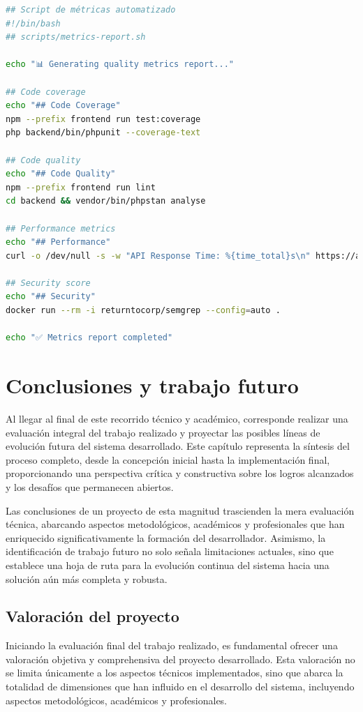 \documentclass[12pt,a4paper,oneside]{report}
\begin{document}
\begin{lstlisting}[language=bash]
## Script de métricas automatizado
#!/bin/bash
## scripts/metrics-report.sh

echo "📊 Generating quality metrics report..."

## Code coverage
echo "## Code Coverage"
npm --prefix frontend run test:coverage
php backend/bin/phpunit --coverage-text

## Code quality
echo "## Code Quality"
npm --prefix frontend run lint
cd backend && vendor/bin/phpstan analyse

## Performance metrics
echo "## Performance"
curl -o /dev/null -s -w "API Response Time: %{time_total}s\n" https://api.tfg-platform.com/health

## Security score
echo "## Security"
docker run --rm -i returntocorp/semgrep --config=auto .

echo "✅ Metrics report completed"
\end{lstlisting}

\chapter{Conclusiones y trabajo
futuro}\label{conclusiones-y-trabajo-futuro}

Al llegar al final de este recorrido técnico y académico, corresponde
realizar una evaluación integral del trabajo realizado y proyectar las
posibles líneas de evolución futura del sistema desarrollado. Este
capítulo representa la síntesis del proceso completo, desde la
concepción inicial hasta la implementación final, proporcionando una
perspectiva crítica y constructiva sobre los logros alcanzados y los
desafíos que permanecen abiertos.

Las conclusiones de un proyecto de esta magnitud trascienden la mera
evaluación técnica, abarcando aspectos metodológicos, académicos y
profesionales que han enriquecido significativamente la formación del
desarrollador. Asimismo, la identificación de trabajo futuro no solo
señala limitaciones actuales, sino que establece una hoja de ruta para
la evolución continua del sistema hacia una solución aún más completa y
robusta.

\section{Valoración del proyecto}\label{valoraciuxf3n-del-proyecto}

Iniciando la evaluación final del trabajo realizado, es fundamental
ofrecer una valoración objetiva y comprehensiva del proyecto
desarrollado. Esta valoración no se limita únicamente a los aspectos
técnicos implementados, sino que abarca la totalidad de dimensiones que
han influido en el desarrollo del sistema, incluyendo aspectos
metodológicos, académicos y profesionales.
\end{document}
